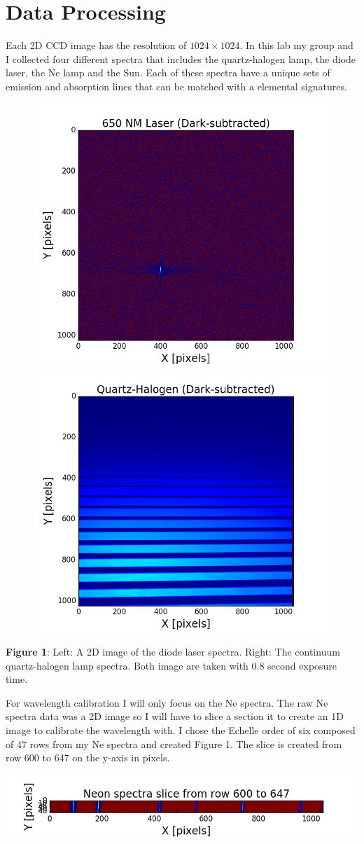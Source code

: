 \documentclass[onecolumn, 12pt, a4paper]{article}
\begin{document}
\section{Data Processing}
Each 2D CCD image has the resolution of $1024 \times 1024$. In this lab my group and I collected four different spectra that includes the quartz-halogen lamp, the diode laser, the Ne lamp and the Sun. Each of these spectra have a unique sets of emission and absorption lines that can be matched with a elemental signatures. \newline
\begin{subfigure}{\linewidth}\hspace*{-.8cm}
  \includegraphics[width=.55\linewidth]{figure_1-11.png}
  \includegraphics[width=.55\linewidth]{figure_1-12.png}
\end{subfigure}\par\medskip

\textbf{Figure 1}: Left: A 2D image of the diode laser spectra. Right: The continuum quartz-halogen lamp spectra. Both image are taken with 0.8 second exposure time.

\begin{flushleft}
For wavelength calibration I will only focus on the Ne spectra. The raw Ne spectra data was a 2D image so I will have to slice a section it to create an 1D image to calibrate the wavelength with. I chose the Echelle order of six composed of 47 rows from my Ne spectra and created Figure 1. The slice is created from row 600 to 647 on the y-axis in pixels.
\end{flushleft}
\centerline{\includegraphics[width=.8\linewidth]{figure_1-2.png}}
\newline 
\end{document}
